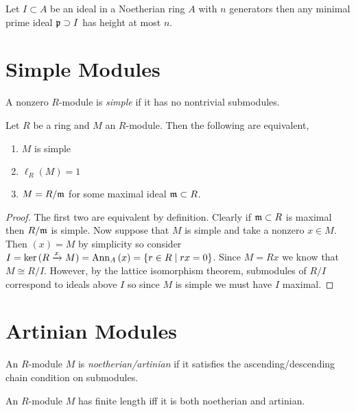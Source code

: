 \documentclass[12pt]{article}
\begin{document}
\begin{theorem}
Let $I \subset A$ be an ideal in a Noetherian ring $A$ with $n$ generators then any minimal prime ideal $\mathfrak{p} \supset I$ has height at most $n$.
\end{theorem}

\section{Simple Modules}

\begin{defn}
A nonzero $R$-module is \textit{simple} if it has no nontrivial submodules.
\end{defn}

\begin{prop}
Let $R$ be a ring and $M$ an $R$-module. Then the following are equivalent,
\begin{enumerate}
\item $M$ is simple
\item $\ell_R(M) = 1$
\item $M = R / \mathfrak{m}$ for some maximal ideal $\mathfrak{m} \subset R$.
\end{enumerate}
\end{prop}

\begin{proof}
The first two are equivalent by definition. Clearly if $\mathfrak{m} \subset R$ is maximal then $R / \mathfrak{m}$ is simple. Now suppose that $M$ is simple and take a nonzero $x \in M$. Then $(x) = M$ by simplicity so consider $I = \ker{(R \xrightarrow{x} M)} = \mathrm{Ann}_{A}\left(x\right) = \{r \in R \mid r x = 0\}$. Since $M = R x$ we know that $M \cong R / I$. However, by the lattice isomorphism theorem, submodules of $R / I$ correspond to ideals above $I$ so since $M$ is simple we must have $I$ maximal.  
\end{proof}

\section{Artinian Modules}

\begin{defn}
An $R$-module $M$ is \textit{noetherian/artinian} if it satisfies the ascending/descending chain condition on submodules.
\end{defn}

\begin{theorem}
An $R$-module $M$ has finite length iff it is both noetherian and artinian.
\end{theorem}
\end{document}
